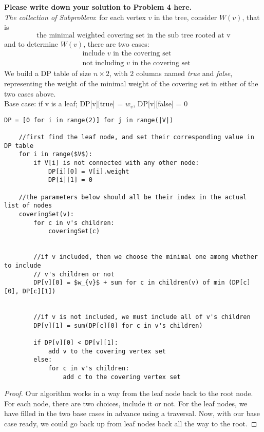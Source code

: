 \documentclass[11pt,twoside]{article}
\newenvironment{solution}{{\par\noindent\it Solution.}}{}
\begin{document}
\begin{solution}
\textbf{Please write down your solution to Problem 4 here.}\\
\textit{The collection of Subproblem}: for each vertex $v$ in the tree, consider  $W(v)$, that is $$\text{the minimal weighted covering set in the sub tree rooted at v}$$ and to determine $W(v)$, there are two cases: \begin{align*}
    &\text{include $v$ in the covering set}\\
    &\text{not including $v$ in the covering set}
\end{align*}
We build a DP table of size $n\times 2$, with $2$ columns named \textit{true} and \textit{false}, representing the weight of the minimal weight of the covering set in either of the two cases above.\\
Base case: if v is a leaf; DP[v][true] = $w_{v}$,  DP[v][false] = $0$
\begin{lstlisting}[mathescape,showstringspaces=false,linewidth=20cm]
    DP = [0 for i in range(2)] for j in range(|V|)
    
    //first find the leaf node, and set their corresponding value in DP table
    for i in range($V$):
        if V[i] is not connected with any other node:
            DP[i][0] = V[i].weight
            DP[i][1] = 0
    
    //the parameters below should all be their index in the actual list of nodes
    coveringSet(v):
        for c in v's children:
            coveringSet(c)
        
        
        //if v included, then we choose the minimal one among whether to include
        // v's children or not 
        DP[v][0] = $w_{v}$ + sum for c in children(v) of min (DP[c][0], DP[c][1])
        
        
        //if v is not included, we must include all of v's children
        DP[v][1] = sum(DP[c][0] for c in v's children)
        
        if DP[v][0] < DP[v][1]:
            add v to the covering vertex set
        else:
            for c in v's children:
                add c to the covering vertex set
\end{lstlisting}
\begin{proof}
Our algorithm works in a way from the leaf node back to the root node. For each node, there are two choices, include it or not. For the leaf nodes, we have filled in the two base cases in advance using a traversal. Now, with our base case ready, we could go back up from leaf nodes back all the way to the root.


\end{proof}
\end{solution}
\end{document}

